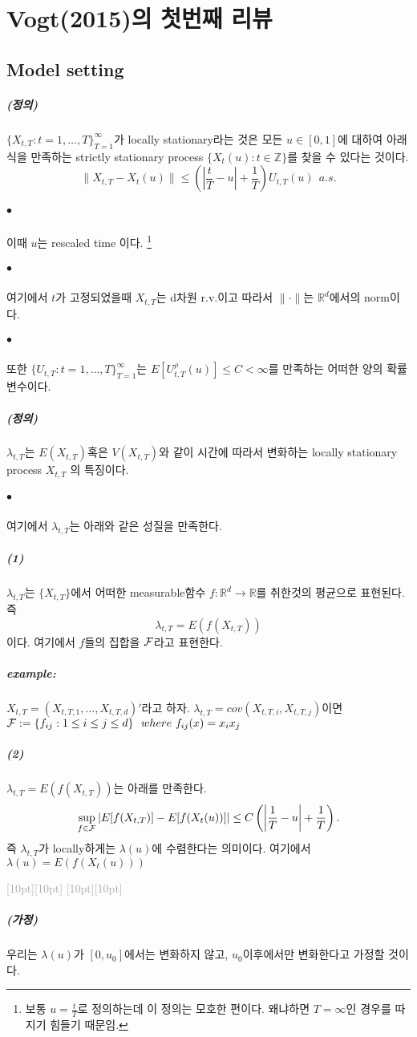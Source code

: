 \documentclass[12pt,oneside,english]{book}
\newcommand{\rdash}{\noindent \textcolor{darkgray}{ \raisebox{-1.9pt}[10pt][10pt]{\leafright} \hrulefill \raisebox{-1.9pt}[10pt][10pt]{\leafright \decofourleft \decothreeleft  \aldineright \decotwo \floweroneleft \decoone}}}
\def\ck{\paragraph{\large$\bullet$}\large}
\def\assume{\paragraph{\large(가정)}\large}
\def\dfn{\paragraph{\large(정의)}\large}
\def\ex{\paragraph{\large\textit{example:}}\large}
\def\one{\paragraph{\large(1)}\large}
\def\two{\paragraph{\large(2)}\large}
\begin{document}


\chapter{Vogt(2015)의 첫번째 리뷰}
\section{Model setting}
\dfn 
$\{X_{t,T}:t=1,\dots,T\}_{T=1}^{\infty}$가 locally stationary라는 것은 모든 $u \in [0,1]$에 대하여 아래식을 만족하는 strictly stationary process $\{X_t(u):t \in \mathbb{Z}\}$를 찾을 수 있다는 것이다.
\[
\|X_{t,T}-X_t(u)\|\leq \left(\left| \frac{t}{T}-u \right|+\frac{1}{T} \right)U_{t,T}(u)~~a.s.
\]

\ck 이때 $u$는 rescaled time 이다. \footnote{보통 $u=\frac{t}{T}$로 정의하는데 이 정의는 모호한 편이다. 왜냐하면 $T=\infty$인 경우를 따지기 힘들기 때문임.}

\ck 여기에서 $t$가 고정되었을때 $X_{t,T}$는 d차원 r.v.이고 따라서 $\| \cdot \|$는 $\mathbb{R}^d$에서의 norm이다. 

\ck 또한 $\{U_{t,T}:t=1,\dots,T\}_{T=1}^{\infty}$는 $E[U_{t,T}^{\rho}(u)] \leq C < \infty$를 만족하는 어떠한 양의 확률변수이다. 

\dfn 
$\lambda_{t,T}$는 $E(X_{t,T})$혹은 $V(X_{t,T})$와 같이 시간에 따라서 변화하는 locally stationary process $X_{t,T}$ 의 특징이다. 

\ck 여기에서 $\lambda_{t,T}$는 아래와 같은 성질을 만족한다. 

\one $\lambda_{t,T}$는 $\{X_{t,T}\}$에서 어떠한 measurable함수 $f:\mathbb{R}^d \rightarrow \mathbb{R}$를 취한것의 평균으로 표현된다. 즉 $$\lambda_{t,T}=E(f(X_{t,T}))$$이다. 여기에서 $f$들의 집합을 $\cal F$라고 표현한다. 	

\ex $X_{t,T}=(X_{t,T,1},\dots,X_{t,T,d})'$라고 하자. $\lambda_{t,T}=cov(X_{t,T,i},X_{t,T,j})$이면 ${\cal F}:=\{f_{ij}:1\leq i \leq j \leq d\} ~~ where~f_{ij}(x)=x_ix_j$

\two $\lambda_{t,T}=E(f(X_{t,T}))$는 아래를 만족한다. $$\sup_{f\in {\cal F}} \left|E[f(X_{t,T})]-E[f(X_t(u))]\right| \leq C \left(\left| \frac{1}{T}-u \right|+\frac{1}{T} \right).$$ 즉 $\lambda_{t,T}$가 locally하게는 $\lambda(u)$에 수렴한다는 의미이다. 여기에서 $\lambda(u)=E(f(X_t(u)))$

\rdash

\assume 우리는 $\lambda(u)$가 $[0,u_0]$에서는 변화하지 않고, $u_0$이후에서만 변화한다고 가정할 것이다. 
\end{document}
